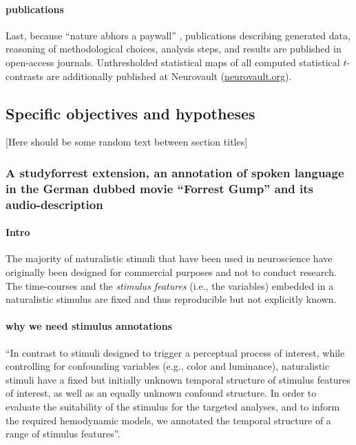 \paragraph{publications}
Last, because ``nature abhors a paywall'' \citep{dupre2020nature}, publications
describing generated data, reasoning of methodological choices, analysis steps,
and results are published in open-access journals.
Unthresholded statistical maps of all computed statistical $t$-contrasts are
additionally published at Neurovault
(\href{https://neurovault.org/}{neurovault.org}).


\subsection{Specific objectives and hypotheses}

[Here should be some random text between section titles]

\subsubsection{A studyforrest extension, an annotation of spoken language in the
German dubbed movie ``Forrest Gump'' and its audio-description}



\paragraph{Intro}


%
The majority of naturalistic stimuli that have been used in neuroscience have
originally been designed for commercial purposes and not to conduct research.
%
The time-courses and the \textit{stimulus features} (i.e., the variables)
embedded in a naturalistic stimulus are fixed and thus reproducible but not
explicitly known.

\paragraph{why we need stimulus annotations}

``In contrast to stimuli designed to trigger a perceptual process of interest,
while controlling for confounding variables (e.g., color and luminance),
naturalistic stimuli have a fixed but initially unknown temporal structure of
stimulus features of interest, as well as an equally unknown confound structure.
In order to evaluate the suitability of the stimulus for the targeted analyses,
and to inform the required hemodynamic models, we annotated the temporal
structure of a range of stimulus features''.


